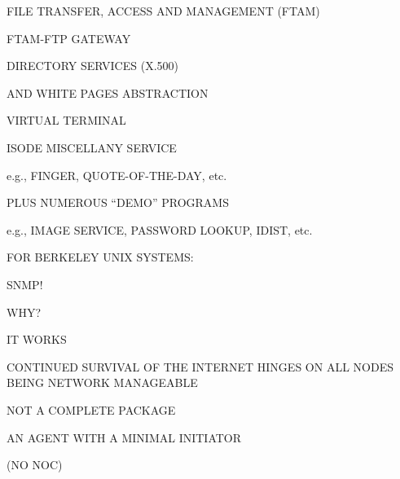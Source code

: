 \begin{bwslide}

\begin{nrtc}
\item	FILE TRANSFER, ACCESS AND MANAGEMENT (FTAM)

\item	FTAM-FTP GATEWAY

\item	DIRECTORY SERVICES (X.500)
    \begin{nrtc}
    \item	AND WHITE PAGES ABSTRACTION
    \end{nrtc}

\item	VIRTUAL TERMINAL

\item	ISODE MISCELLANY SERVICE
    \begin{nrtc}
    \item	e.g., FINGER, QUOTE-OF-THE-DAY, etc.
    \end{nrtc}

\item	PLUS NUMEROUS ``DEMO'' PROGRAMS
    \begin{nrtc}
    \item	e.g., IMAGE SERVICE, PASSWORD LOOKUP, IDIST, etc.
    \end{nrtc}
\end{nrtc}
\end{bwslide}


\begin{bwslide}

\begin{nrtc}
\item	FOR BERKELEY UNIX SYSTEMS:
    \begin{nrtc}
    \item	SNMP!
    \end{nrtc}

\item	WHY?
    \begin{nrtc}
    \item	IT WORKS

    \item	CONTINUED SURVIVAL OF THE INTERNET HINGES ON ALL NODES BEING
		NETWORK MANAGEABLE
    \end{nrtc}

\item	NOT A COMPLETE PACKAGE
    \begin{nrtc}
    \item	AN AGENT WITH A MINIMAL INITIATOR

    \item	(NO NOC)
    \end{nrtc}
\end{nrtc}
\end{bwslide}


